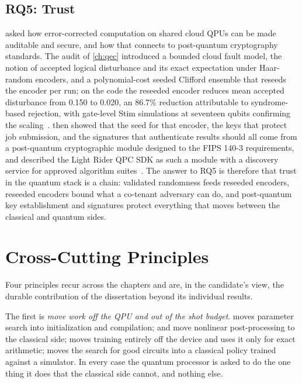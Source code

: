 \subsection{RQ5: Trust}\label{sec:conclusion:rq5}

 asked how error-corrected computation on shared cloud QPUs can be made auditable and secure, and how that connects to post-quantum cryptography standards. The audit of \cref{ch:qec} introduced a bounded cloud fault model, the notion of accepted logical disturbance and its exact expectation under Haar-random encoders, and a polynomial-cost seeded Clifford ensemble that reseeds the encoder per run; on the  code the reseeded encoder reduces mean accepted disturbance from 0.150 to 0.020, an 86.7\% reduction attributable to syndrome-based rejection, with gate-level Stim simulations at seventeen qubits confirming the scaling~\cite{guo2026qecaudit}.  then showed that the seed for that encoder, the keys that protect job submission, and the signatures that authenticate results should all come from a post-quantum cryptographic module designed to the FIPS 140-3 requirements, and described the Light Rider QPC SDK as such a module with a discovery service for approved algorithm suites~\cite{guo2026lightriderqpc}. The answer to RQ5 is therefore that trust in the quantum stack is a chain: validated randomness feeds reseeded encoders, reseeded encoders bound what a co-tenant adversary can do, and post-quantum key establishment and signatures protect everything that moves between the classical and quantum sides.

\section{Cross-Cutting Principles}\label{sec:conclusion:principles}

Four principles recur across the chapters and are, in the candidate's view, the durable contribution of the dissertation beyond its individual results.

The first is \emph{move work off the QPU and out of the shot budget}. \deal{} moves parameter search into initialization and compilation; \qawa{} and \vqt{} move nonlinear post-processing to the classical side; \nnqa{} moves training entirely off the device and uses it only for exact arithmetic; \rubriq{} moves the search for good circuits into a classical policy trained against a simulator. In every case the quantum processor is asked to do the one thing it does that the classical side cannot, and nothing else.

